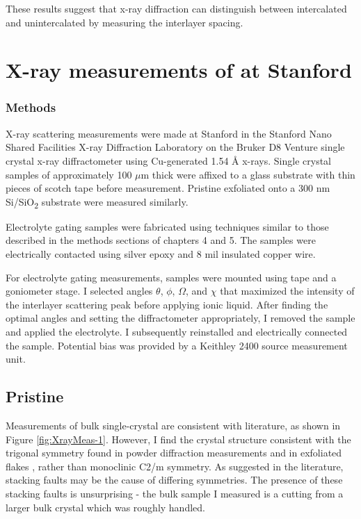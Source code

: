 These results suggest that x-ray diffraction can distinguish between intercalated and unintercalated \rucl by measuring the interlayer spacing.

\section{X-ray measurements of \rucl at Stanford} 

\subsubsection{Methods}
X-ray scattering measurements were made at Stanford in the Stanford Nano Shared Facilities X-ray Diffraction Laboratory on the Bruker D8 Venture single crystal x-ray diffractometer using Cu-generated 1.54 \AA{} x-rays. Single crystal samples of \rucl approximately 100 $\mu$m thick were affixed to a glass substrate with thin pieces of scotch tape before measurement. Pristine \rucl exfoliated onto a 300 nm Si/SiO\textsubscript{2} substrate were measured similarly.

Electrolyte gating samples were fabricated using techniques similar to those described in the methods sections of chapters 4 and 5. The samples were electrically contacted using silver epoxy and 8 mil insulated copper wire.

For electrolyte gating measurements, samples were mounted using tape and a goniometer stage. I selected angles $\theta$, $\phi$, $\Omega$, and $\chi$ that maximized the intensity of the interlayer scattering peak before applying ionic liquid. After finding the optimal angles and setting the diffractometer appropriately, I removed the sample and applied the electrolyte. I subsequently reinstalled and electrically connected the sample. Potential bias was provided by a Keithley 2400 source measurement unit.

\subsection{Pristine \rucl}

Measurements of bulk single-crystal \rucl are consistent with literature, as shown in Figure \ref{fig:XrayMeas-1}. However, I find the crystal structure consistent with the trigonal symmetry found in powder diffraction measurements  \cite{Fletcher1967} and in exfoliated flakes \cite{Gronke2018}, rather than monoclinic C2/m symmetry. As suggested in the literature, stacking faults may be the cause of differing symmetries. The presence of these stacking faults is unsurprising - the bulk sample I measured is a cutting from a larger bulk crystal which was roughly handled.

